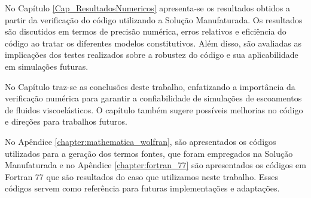 No Capítulo \ref{Cap_ResultadosNumericos} apresenta-se os resultados obtidos a partir da verificação do código utilizando a Solução Manufaturada. Os resultados são discutidos em termos de precisão numérica, erros relativos e eficiência do código ao tratar os diferentes modelos constitutivos. Além disso, são avaliadas as implicações dos testes realizados sobre a robustez do código e sua aplicabilidade em simulações futuras.

No Capítulo traz-se as conclusões deste trabalho, enfatizando a importância da verificação numérica para garantir a confiabilidade de simulações de escoamentos de fluidos viscoelásticos. O capítulo também sugere possíveis melhorias no código e direções para trabalhos futuros.

No Apêndice \ref{chapter:mathematica_wolfran}, são apresentados os códigos utilizados para a geração dos termos fontes, que foram empregados na Solução Manufaturada e no Apêndice \ref{chapter:fortran_77} são apresentados os códigos em Fortran 77 que são resultados do caso que utilizamos neste trabalho. Esses códigos servem como referência para futuras implementações e adaptações.